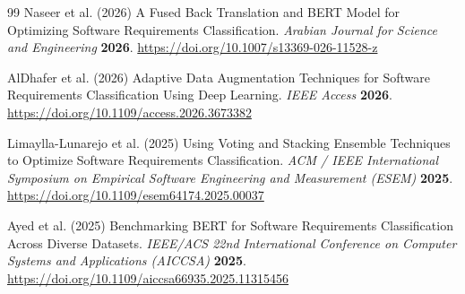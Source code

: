 \begin{thebibliography}{99}
Naseer et al. (2026) A Fused Back Translation and BERT Model for Optimizing Software Requirements Classification. \emph{Arabian Journal for Science and Engineering} \textbf{2026}. \url{https://doi.org/10.1007/s13369-026-11528-z}

AlDhafer et al. (2026) Adaptive Data Augmentation Techniques for Software Requirements Classification Using Deep Learning. \emph{IEEE Access} \textbf{2026}. \url{https://doi.org/10.1109/access.2026.3673382}

Limaylla-Lunarejo et al. (2025) Using Voting and Stacking Ensemble Techniques to Optimize Software Requirements Classification. \emph{ACM / IEEE International Symposium on Empirical Software Engineering and Measurement (ESEM)} \textbf{2025}. \url{https://doi.org/10.1109/esem64174.2025.00037}

Ayed et al. (2025) Benchmarking BERT for Software Requirements Classification Across Diverse Datasets. \emph{IEEE/ACS 22nd International Conference on Computer Systems and Applications (AICCSA)} \textbf{2025}. \url{https://doi.org/10.1109/aiccsa66935.2025.11315456}

\end{thebibliography}